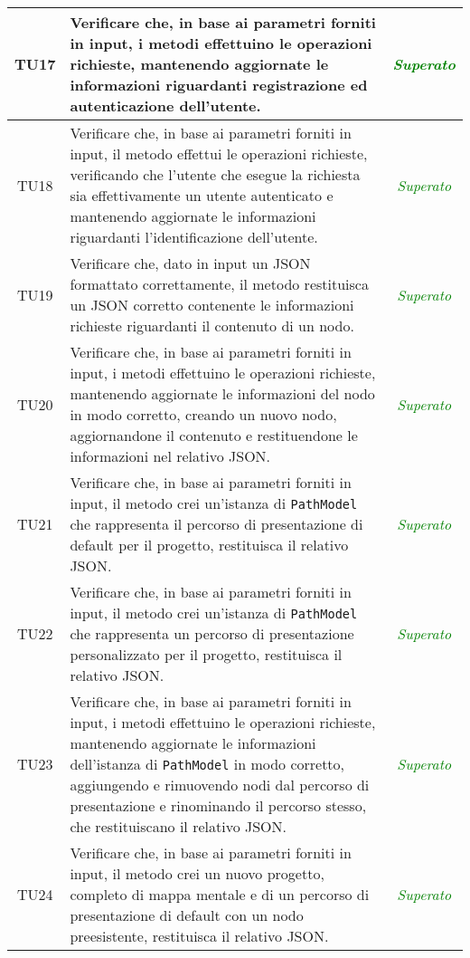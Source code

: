 \begin{longtable}{|c|>{}m{8cm}|c|}
\hypertarget{TU17}{TU17} & Verificare che, in base ai parametri forniti in input, i metodi effettuino le operazioni richieste, mantenendo aggiornate le informazioni riguardanti registrazione ed autenticazione dell’utente\finaleTestUnita{}. & \textcolor{Green}{\textit{Superato}}\\ \hline
\hypertarget{TU18}{TU18} & Verificare che, in base ai parametri forniti in input, il metodo effettui le operazioni richieste, verificando che l'utente che esegue la richiesta sia effettivamente un utente autenticato e  mantenendo aggiornate le informazioni riguardanti l'identificazione dell’utente\finaleTestUnita{}. & \textcolor{Green}{\textit{Superato}}\\ \hline
\hypertarget{TU19}{TU19} & Verificare che, dato in input un JSON formattato correttamente, il metodo restituisca un JSON corretto contenente le informazioni richieste riguardanti il contenuto di un nodo\finaleTestUnita{}. & \textcolor{Green}{\textit{Superato}}\\ \hline
\hypertarget{TU20}{TU20} & Verificare che, in base ai parametri forniti in input, i metodi effettuino le operazioni richieste, mantenendo aggiornate le informazioni del nodo in modo corretto, creando un nuovo nodo, aggiornandone il contenuto e restituendone le informazioni nel relativo JSON\finaleTestUnita{}. & \textcolor{Green}{\textit{Superato}}\\ \hline
\hypertarget{TU21}{TU21} & Verificare che, in base ai parametri forniti in input, il metodo crei un'istanza di \texttt{PathModel} che rappresenta il percorso di presentazione di default per il progetto, restituisca il relativo JSON\finaleTestUnita{}. & \textcolor{Green}{\textit{Superato}}\\ \hline
\hypertarget{TU22}{TU22} & Verificare che, in base ai parametri forniti in input, il metodo crei un'istanza di \texttt{PathModel} che rappresenta un percorso di presentazione personalizzato per il progetto, restituisca il relativo JSON\finaleTestUnita{}. & \textcolor{Green}{\textit{Superato}}\\ \hline
\hypertarget{TU23}{TU23} & Verificare che, in base ai parametri forniti in input, i metodi effettuino le operazioni richieste, mantenendo aggiornate le informazioni dell'istanza di \texttt{PathModel} in modo corretto, aggiungendo e rimuovendo nodi dal percorso di presentazione e rinominando il percorso stesso, che restituiscano il relativo JSON\finaleTestUnita{}. & \textcolor{Green}{\textit{Superato}}\\ \hline
\hypertarget{TU24}{TU24} & Verificare che, in base ai parametri forniti in input, il metodo crei un nuovo progetto, completo di mappa mentale e di un percorso di presentazione di default con un nodo preesistente, restituisca il relativo JSON\finaleTestUnita{}. & \textcolor{Green}{\textit{Superato}}\\ \hline

\end{longtable}
